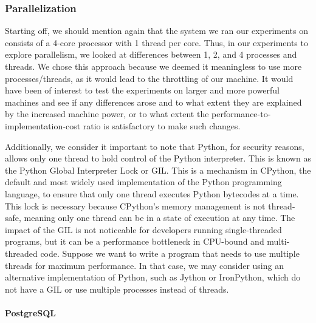 \subsubsection{Parallelization}

Starting off, we should mention again that the system we ran our experiments on consists of a 4-core processor with 1 thread per core. 
Thus, in our experiments to explore parallelism, we looked at differences between 1, 2, and 4 processes and threads. 
We chose this approach because we deemed it meaningless to use more processes/threads, as it would lead to the throttling of our machine. 
It would have been of interest to test the experiments on larger and more powerful machines and see if any differences arose 
and to what extent they are explained by the increased machine power, or to what extent the performance-to-implementation-cost ratio is satisfactory 
to make such changes.

Additionally, we consider it important to note that Python, for security reasons, allows only one thread to hold control of the Python interpreter. 
This is known as the Python Global Interpreter Lock or GIL. This is a mechanism in CPython, the default and most widely used implementation of the 
Python programming language, to ensure that only one thread executes Python bytecodes at a time. 
This lock is necessary because CPython's memory management is not thread-safe, meaning only one thread can be in a state of execution at any time. 
The impact of the GIL is not noticeable for developers running single-threaded programs, 
but it can be a performance bottleneck in CPU-bound and multi-threaded code. Suppose we want to write a program that needs to use multiple threads 
for maximum performance. In that case, we may consider using an alternative implementation of Python, such as Jython or IronPython, 
which do not have a GIL or use multiple processes instead of threads.\\\\

{\bfseries PostgreSQL}\\

